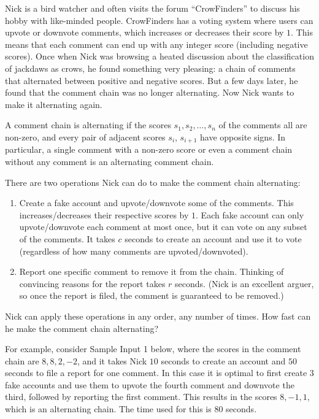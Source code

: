 
%
\noindent
Nick is a bird watcher and often visits the forum ``CrowFinders'' to discuss his hobby with like-minded people.
CrowFinders has a voting system where users can upvote or downvote comments, which increases or decreases their score by $1$.
This means that each comment can end up with any integer score (including negative scores).
Once when Nick was browsing a heated discussion about the classification of jackdaws as crows, he found something very pleasing: a chain of comments
that alternated between positive and negative scores. But a few days later, he found that the comment chain was no longer alternating.
Now Nick wants to make it alternating again.

A comment chain is alternating if the scores $s_1, s_2, \ldots, s_n$ of the comments all are non-zero, and every pair of adjacent scores $s_i$, $s_{i+1}$ have opposite signs.
In particular, a single comment with a non-zero score or even a comment chain without any comment is an alternating comment chain.

There are two operations Nick can do to make the comment chain alternating:
\begin{enumerate}
    \item Create a fake account and upvote/downvote some of the comments. This increases/decreases their respective scores by $1$. 
    Each fake account can only upvote/downvote each comment at most once, but it can vote on any subset of the comments.
    It takes $c$ seconds to create an account and use it to vote (regardless of how many comments are upvoted/downvoted).
    \item Report one specific comment to remove it from the chain. Thinking of convincing reasons for the report takes $r$ seconds.
    (Nick is an excellent arguer, so once the report is filed, the comment is guaranteed to be removed.)
\end{enumerate}

Nick can apply these operations in any order, any number of times. How fast can he make the comment chain alternating?

For example, consider Sample Input 1 below, where the scores in the comment chain are $8, 8, 2, -2$, and it takes Nick $10$ seconds to create an
account and $50$ seconds to file a report for one comment. In this case it is optimal to first create $3$ fake accounts and use them to upvote
the fourth comment and downvote the third, followed by reporting the first comment. This results in the scores $8, -1, 1$, which is
an alternating chain. The time used for this is $80$ seconds.

